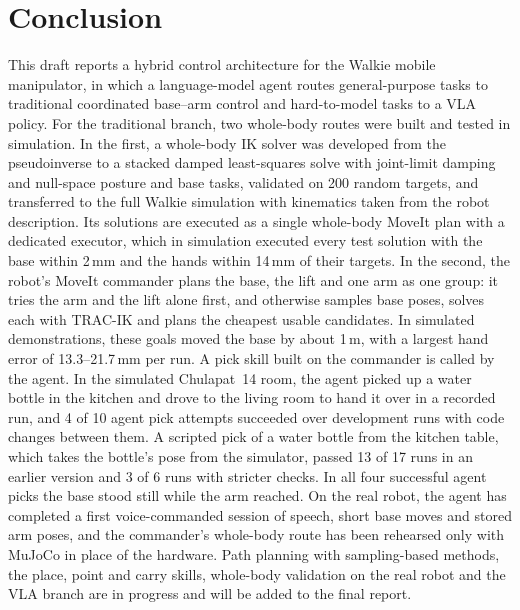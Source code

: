 \documentclass[12pt,a4paper]{article}
\begin{document}
\section{Conclusion}
\label{sec:conclusion}

This draft reports a hybrid control architecture for the Walkie mobile manipulator, in which a
language-model agent routes general-purpose tasks to traditional coordinated base--arm control and
hard-to-model tasks to a VLA policy. For the traditional branch, two whole-body routes were built and
tested in simulation. In the first, a whole-body IK solver was developed from the pseudoinverse to a
stacked damped least-squares solve with joint-limit damping and null-space posture and base tasks,
validated on 200 random targets, and transferred to the full Walkie simulation with kinematics taken
from the robot description. Its solutions are executed as a single whole-body MoveIt plan with a
dedicated executor, which in simulation executed every test solution with the base within 2\,mm and
the hands within 14\,mm of their targets. In the second, the robot's MoveIt commander plans the base,
the lift and one arm as one group: it tries the arm and the lift alone first, and otherwise samples
base poses, solves each with TRAC-IK and plans the cheapest usable candidates. In simulated
demonstrations, these goals moved the base by about 1\,m, with a largest hand error of
13.3--21.7\,mm per run. A pick skill built on the commander is called by the agent. In the simulated
Chulapat~14 room, the agent picked up a water bottle in the kitchen and drove to the living room to
hand it over in a recorded run, and 4 of 10 agent pick attempts succeeded over development runs with
code changes between them. A scripted pick of a water bottle from the kitchen table, which takes the
bottle's pose from the simulator, passed 13 of 17 runs in an earlier version and 3 of 6 runs with
stricter checks. In all
four successful agent picks the base stood still while the arm reached. On the real robot, the agent
has completed a first voice-commanded session of speech, short base moves and stored arm poses, and
the commander's whole-body route has been rehearsed only with MuJoCo in place of the hardware. Path
planning with sampling-based methods, the place, point and carry skills, whole-body validation on the
real robot and the VLA branch are in progress and will be added to the final report.

\clearpage



\end{document}
